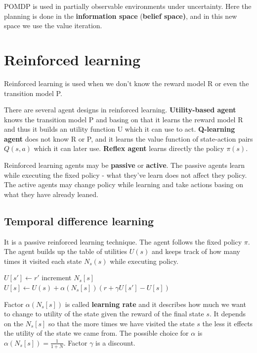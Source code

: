 \documentclass[a4paper,10pt]{article}
\begin{document}
POMDP is used in partially observable environments under uncertainty. Here the planning is done in the \textbf{information space} (\textbf{belief space)}, and in this new space we use the value iteration.

\section{Reinforced learning}

Reinforced learning is used when we don't know the reward model R or even the transition model P.

There are several agent designs in reinforced learning. \textbf{Utility-based agent} knows the transition model P and basing on that it learns the reward model R and thus it builds an utility function U which it can use to act. \textbf{Q-learning agent} does not know R or P, and it learns the value function of state-action pairs $Q(s,a)$ which it can later use. \textbf{Reflex agent} learns directly the policy $\pi(s)$.

Reinforced learning agents may be \textbf{passive} or \textbf{active}. The passive agents learn while executing the fixed policy - what they've learn does not affect they policy. The active agents may change policy while learning and take actions basing on what they have already leaned.

\subsection{Temporal difference learning}

It is a passive reinforced learning technique. The agent follows the fixed policy $\pi$. The agent builds up the table of utilities $U(s)$ and keeps track of how many times it visited each state $N_s(s)$ while executing policy. 

\begin{algorithmic}
	\STATE $U[s'] \gets r'$
	\STATE increment $N_s[s]$
	\STATE $U[s]  \leftarrow U(s) + \alpha (N_s[s])(r+\gamma U[s']-U[s])$
\ENDIF
\end{algorithmic}

Factor $\alpha (N_s[s])$ is called \textbf{learning rate} and it describes how much we want to change to utility of the state given the reward of the final state $s$. It depends on the $N_s[s]$ so that the more times we have visited the state $s$ the less it effects the utility of the state we came from. The possible choice for $\alpha$ is $\alpha(N_s[s])= \frac{1}{1+N}$. Factor $\gamma$ is a discount.
\end{document}
